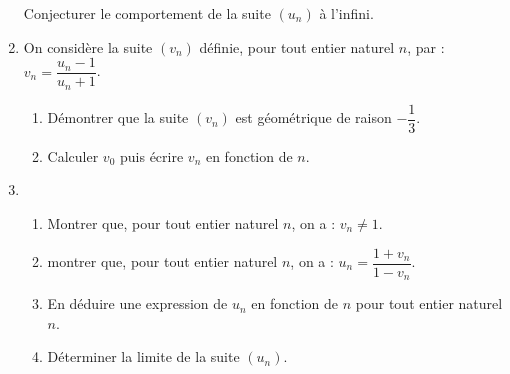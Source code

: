 \begin{enumerate}
Conjecturer le comportement de la suite $\left(u_{n}\right)$ à l'infini. 
\item On considère la suite $\left(v_{n}\right)$ définie, pour tout entier naturel $n$, par : $v_{n} = \dfrac{u_{n} - 1}{u_{n} + 1}$. 
	\begin{enumerate}
		\item Démontrer que la suite $\left(v_{n}\right)$ est géométrique de raison $- \dfrac{1}{3}$. 
		\item Calculer $v_{0}$ puis écrire $v_{n}$ en fonction de $n$.
	\end{enumerate} 
\item
	\begin{enumerate}
		\item Montrer que, pour tout entier naturel $n$, on a : $v_{n} \neq 1$. 
		\item montrer que, pour tout entier naturel $n$, on a : $u_{n} = \dfrac{1 + v_{n}}{1 - v_{n}}$.  
		\item En déduire une expression de $u_n$ en fonction de $n$ pour tout entier
		naturel $n$.
		\item Déterminer la limite de la suite $\left(u_{n}\right)$. 
	\end{enumerate}
\end{enumerate}

